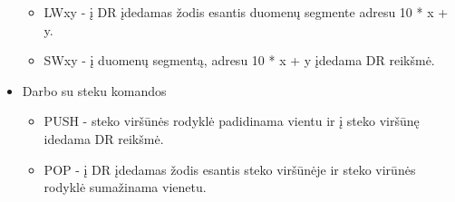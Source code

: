 \begin{itemize}
\begin{itemize}
		\item LWxy - į DR įdedamas žodis esantis duomenų segmente adresu 10 * x + y.
		\item SWxy - į duomenų segmentą, adresu 10 * x + y įdedama DR reikšmė.
		\end{itemize}
	\item Darbo su steku komandos
		\begin{itemize}
		\item PUSH - steko viršūnės rodyklė padidinama vientu ir į steko viršūnę idedama DR reikšmė.
		\item POP - į DR įdedamas žodis esantis steko viršūnėje ir steko virūnės rodyklė sumažinama vienetu.
		\end{itemize}
		
	\end{itemize}
